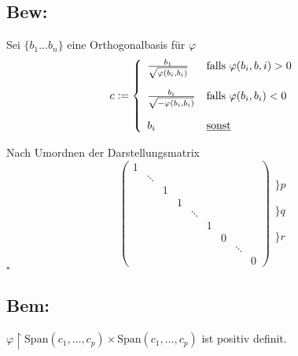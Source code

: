 \documentclass[titlepage,12pt,a4paper,ngerman]{report}
\newenvironment{bew}{\subsection{Bew:}}{\hfill$\square$}
\newcommand{\Bew}[1]{\begin{bew}#1\end{bew}}
\newcommand{\tx}[1]{\textrm{#1}}
\begin{document}
\Bew{Sei $\{b_1 \dots b_n\}$ eine Orthogonalbasis für $\varphi$
	$$ c := \left \{ 
	\begin{array}{ll}
	\frac{b_1}{\sqrt{\varphi(b_i,b_i)}} & \tx{falls } \varphi(b_i,b,i) > 0\\[15pt]
	\frac{b_i}{\sqrt{-\varphi(b_i,b_i)}} & \tx{falls } \varphi(b_i,b_i) < 0\\[15pt]
	b_i & \tx{\underline{sonst}}
	\end{array}\right.$$
	
	Nach Umordnen der Darstellungsmatrix  
	$$\begin{pmatrix}
	1\\
	& \ddots\\
	& & 1\\
	& & &1\\
	& & & & \ddots\\
	& & & & & 1\\
	& & & & & & 0\\
	& & & & & & & \ddots\\
	& & & & & & & & 0
	\end{pmatrix} \begin{array}{ll}
	\\
	\bigg\} p\\
	\\
	\\
	\bigg\} q\\
	\\
	\\
	\bigg\} r\\
	\\
	\end{array}$$}

\subsection*{Bem:}
$ \varphi \upharpoonright \tx{Span}(c_1,\dots,c_p) \times \tx{Span}(c_1,\dots,c_p) $ ist positiv definit.
\end{document}
